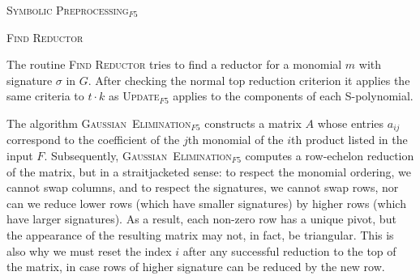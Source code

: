 \begin{algorithm}
\caption{\textsc{Symbolic Preprocessing}$_{F5}$}
\label{alg:symbolic_preprocessing5}
\end{algorithm}

\begin{algorithm}
\caption{\textsc{Find Reductor}}
\label{alg:find_reductor}
\end{algorithm}

The routine \textsc{Find Reductor} tries to find a reductor for a monomial $m$ with signature $\sigma$ in $G$. After checking the normal top reduction criterion it applies the same criteria to $t \cdot k$ as \textsc{Update}$_{F5}$ applies to the components of each S-polynomial.

The algorithm \textsc{Gaussian\ Elimination}$_{F5}$ constructs a matrix $A$ whose entries $a_{ij}$ correspond to the coefficient of the $j$th monomial of the $i$th product listed in the input $F$. 
Subsequently, \textsc{Gaussian\ Elimination}$_{F5}$ computes a row-echelon reduction of the matrix, but in a straitjacketed sense: to respect the monomial ordering, we cannot swap columns, and to respect the signatures, we cannot swap rows, nor can we reduce lower rows (which have smaller signatures) by higher rows (which have larger signatures). As a result, each non-zero row has a unique pivot, but the appearance of the resulting matrix may not, in fact, be triangular. This is also why we must reset the index $i$ after any successful reduction to the top of the matrix, in case rows of higher signature can be reduced by the new row. 

